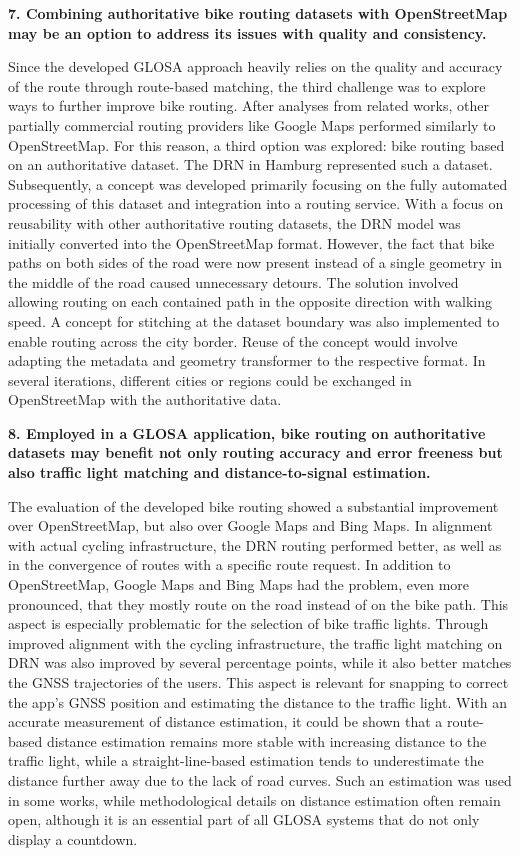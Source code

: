 \textbf{\color{cidarkblue}7. Combining authoritative bike routing datasets with OpenStreetMap may be an option to address its issues with quality and consistency.}

Since the developed GLOSA approach heavily relies on the quality and accuracy of the route through route-based matching, the third challenge was to explore ways to further improve bike routing. After analyses from related works, other partially commercial routing providers like Google Maps performed similarly to OpenStreetMap. For this reason, a third option was explored: bike routing based on an authoritative dataset. The DRN in Hamburg represented such a dataset. Subsequently, a concept was developed primarily focusing on the fully automated processing of this dataset and integration into a routing service. With a focus on reusability with other authoritative routing datasets, the DRN model was initially converted into the OpenStreetMap format. However, the fact that bike paths on both sides of the road were now present instead of a single geometry in the middle of the road caused unnecessary detours. The solution involved allowing routing on each contained path in the opposite direction with walking speed. A concept for stitching at the dataset boundary was also implemented to enable routing across the city border. Reuse of the concept would involve adapting the metadata and geometry transformer to the respective format. In several iterations, different cities or regions could be exchanged in OpenStreetMap with the authoritative data.

\textbf{\color{cidarkblue}8. Employed in a GLOSA application, bike routing on authoritative datasets may benefit not only routing accuracy and error freeness but also traffic light matching and distance-to-signal estimation.} 

The evaluation of the developed bike routing showed a substantial improvement over OpenStreetMap, but also over Google Maps and Bing Maps. In alignment with actual cycling infrastructure, the DRN routing performed better, as well as in the convergence of routes with a specific route request. In addition to OpenStreetMap, Google Maps and Bing Maps had the problem, even more pronounced, that they mostly route on the road instead of on the bike path. This aspect is especially problematic for the selection of bike traffic lights. Through improved alignment with the cycling infrastructure, the traffic light matching on DRN was also improved by several percentage points, while it also better matches the GNSS trajectories of the users. This aspect is relevant for snapping to correct the app's GNSS position and estimating the distance to the traffic light. With an accurate measurement of distance estimation, it could be shown that a route-based distance estimation remains more stable with increasing distance to the traffic light, while a straight-line-based estimation tends to underestimate the distance further away due to the lack of road curves. Such an estimation was used in some works, while methodological details on distance estimation often remain open, although it is an essential part of all GLOSA systems that do not only display a countdown.

